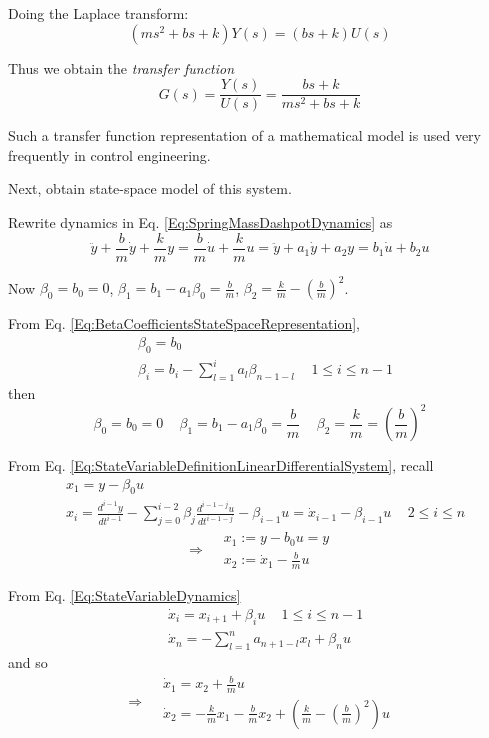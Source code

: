 \documentclass[10pt]{amsart}
\begin{document}
\begin{multicols*}{2}
Doing the Laplace transform:
\[
(ms^2 + bs +k )Y(s) = (bs+k) U(s)
\]

Thus we obtain the \emph{transfer function}
\begin{equation}
G(s) = \frac{Y(s)}{U(s)} = \frac{bs + k}{ ms^2 + bs + k}
\end{equation}

Such a transfer function representation of a mathematical model is used very frequently in control engineering.

Next, obtain state-space model of this system.

Rewrite dynamics in Eq. \ref{Eq:SpringMassDashpotDynamics} as
\begin{equation}
\ddot{y} + \frac{b}{m} \dot{y} + \frac{k}{m} y = \frac{b}{m} \dot{u} + \frac{k}{m} u = \ddot{y} + a_1 \dot{y} + a_2 y = b_1 \dot{u} + b_2 u
\end{equation}

Now $\beta_0 = b_0 = 0$, $\beta_1 = b_1 - a_1 \beta_0 = \frac{b}{m}$, $\beta_2 = \frac{k}{m} - \left( \frac{b}{m} \right)^2$.

From Eq. \ref{Eq:BetaCoefficientsStateSpaceRepresentation}, 
\[
	\begin{aligned}
		& \beta_0 = b_0 \\
		& \beta_i = b_i - \sum_{l=1}^i a_l \beta_{n-1 - l } \quad \, 1 \leq i \leq n -1
	\end{aligned}
\]
then
\[
\beta_0 = b_0 = 0 \quad \, \beta_1 = b_1 - a_1 \beta_0 = \frac{b}{m} \quad \, \beta_2 = \frac{k}{m} = \left( \frac{b}{m} \right)^2
\]

From Eq. \ref{Eq:StateVariableDefinitionLinearDifferentialSystem}, recall
\[
		\begin{aligned}
			& x_1 = y- \beta_0 u \\
			& x_i = \frac{d^{i-1}y}{dt^{i-1}} - \sum_{j=0}^{i-2} \beta_j \frac{d^{i-1 -j} u}{dt^{i-1-j}} - \beta_{i-1} u = \dot{x}_{i-1} - \beta_{i-1}u \quad \, 2 \leq i \leq n
		\end{aligned}
\]
\[
\Longrightarrow \begin{aligned} & x_1 := y -b_0 u = y\\ & x_2 := \dot{x}_1 - \frac{b}{m} u \end{aligned} 
\]

From Eq. \ref{Eq:StateVariableDynamics}
\[
	\begin{aligned}
		& \dot{x}_i = x_{i+1} + \beta_i u \quad \, 1 \leq i \leq n -1 \\
		& \dot{x}_n = -\sum_{l=1}^n a_{n+1 - l} x_l + \beta_n u
	\end{aligned}
\]
and so
\[
\Longrightarrow \begin{aligned} & \dot{x}_1 = x_2 + \frac{b}{m} u \\ & \dot{x}_2 = - \frac{k}{m}x_1 - \frac{b}{m} x_2 + \left( \frac{k}{m} - \left( \frac{b}{m} \right)^2 \right) u \end{aligned}
\]


\end{multicols*}
\end{document}
